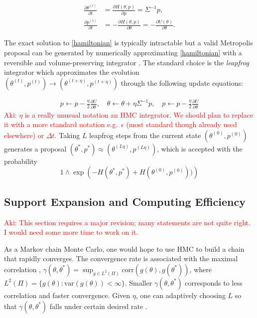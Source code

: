 \documentclass[10pt]{article}
\newcommand{\aki}[1]{\textcolor{red}{Aki: #1}}
\DeclareMathOperator{\1}{\mathbbm{1}}
\begin{document}
\begin{equation}
\begin{aligned}
\label{hamiltonian}
\frac{\partial \theta ^{(t)}}{\partial t} & =\frac{\partial H(\theta, p)}{\partial p} = \Sigma^{-1}p,\\
\frac{\partial p^{(t)}}{\partial t}& =-\frac{\partial H(\theta, p)}{\partial \theta} = -\frac{\partial U(\theta)}{\partial \theta}.
\end{aligned}
\end{equation}

The exact solution to \eqref{hamiltonian} is typically intractable but a valid Metropolis proposal can be generated by numerically approximating \eqref{hamiltonian} with a reversible and volume-preserving  integrator \citep{neal2011mcmc}. The standard choice is the \textit{leapfrog} integrator which approximates the evolution $(\theta^{(t)},p^{(t)}) \to (\theta^{(t + \eta)},p^{(t + \eta)})$ through the following update equations:

\begin{equation}
\begin{aligned}
\label{leap-frog}
p \leftarrow p - \frac{\eta}{2} \frac{\partial U}{\partial  \theta },\quad
\theta \leftarrow  \theta  + \eta \Sigma^{-1}p,\quad
p \leftarrow p -  \frac{\eta}{2}  \frac{\partial U}{\partial  \theta } 
\end{aligned}
\end{equation}
\aki{$\eta$ is a really unusual notation an HMC integrator. We should plan to replace it with a more standard notation e.g.\ $\epsilon$ (most standard though already used elsewhere) or $\Delta t$.}
Taking $L$ leapfrog steps from the current state $(\theta^{(0)},p^{(0)})$ generates a proposal $(\theta^{*},p^{*}) \approx (\theta^{(L \eta)},p^{(L \eta)})$, which is accepted with the probability 
$$1\wedge \exp  \left( - H(\theta^{*},p^{*}) + H(\theta^{(0)},p^{(0)}))\right)$$


\subsection{Support Expansion and Computing Efficiency}

\aki{This section requires a major revision; many statements are not quite right. I would need some more time to work on it.}

As a Markov chain Monte Carlo, one would hope to use HMC to build a chain that rapidly converges. The convergence rate is associated with the maximal correlation  \citep{liu2008monte}, $\gamma (\theta,\theta^*) = \sup_{g \in L^2(\Pi)} \mbox{corr}(g(\theta), g(\theta^*))
$, where $L^2(\Pi)=\{g(\theta): \mbox{var}(g(\theta))<\infty\}$. Smaller $\gamma (\theta,\theta^*)$ corresponds to less correlation and faster convergence. Given $\eta$, one can adaptively choosing $L$ so that $\gamma (\theta,\theta^*)$ falls under certain desired rate \citep{hoffman2014no}.
\end{document}
